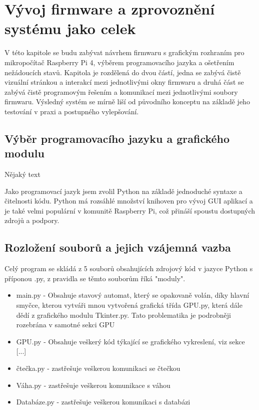 %
%


\chapter{Vývoj firmware a zprovoznění systému jako celek}

V této kapitole se budu zabývat návrhem firmwaru s grafickým rozhraním pro mikropočítač Raspberry Pi 4, výběrem programovacího jazyka a ošetřením nežádoucích
stavů. Kapitola je rozdělená do dvou částí, jedna se zabývá čistě vizuální stránkou a interakcí mezi jednotlivými okny firmwaru a druhá část se zabývá čistě programovým řešením a komunikací mezi jednotlivými soubory firmwaru. Výsledný systém se mírně liší od původního konceptu na základě jeho testování v praxi a postupného vylepšování.

\section{Výběr programovacího jazyku a grafického modulu}
Nějaký text 

Jako programovací jazyk jsem zvolil Python na základě jednoduché syntaxe a čitelnosti kódu. Python má rozsáhlé množství knihoven pro vývoj GUI aplikací a je také velmi populární v komunitě Raspberry Pi, což přináší spoustu dostupných zdrojů a podpory.

\section{Rozložení souborů a jejich vzájemná vazba}

Celý program se skládá z 5 souborů obsahujících zdrojový kód v jazyce Python s příponou .py, z pravidla se těmto souborům říká "moduly".

\begin{itemize}
    \item main.py - Obsahuje stavový automat, který se opakovaně volán, díky hlavní smyčce, kterou vytváři  mnou vytvořená grafická třída GPU.py, která dále dědí z grafického modulu Tkinter.py. Tato problematika je podrobněji rozebrána v samotné sekci GPU
    \item GPU.py - Obsahuje veškerý kód týkající se grafického vykreslení, viz sekce [...]
    \item čtečka.py - zastřešuje veškerou komunikaci se čtečkou
    \item Váha.py - zastřešuje veškerou komunikace s váhou
    \item Databáze.py - zastřešuje veškerou komunikaci s databázi
\end{itemize}



